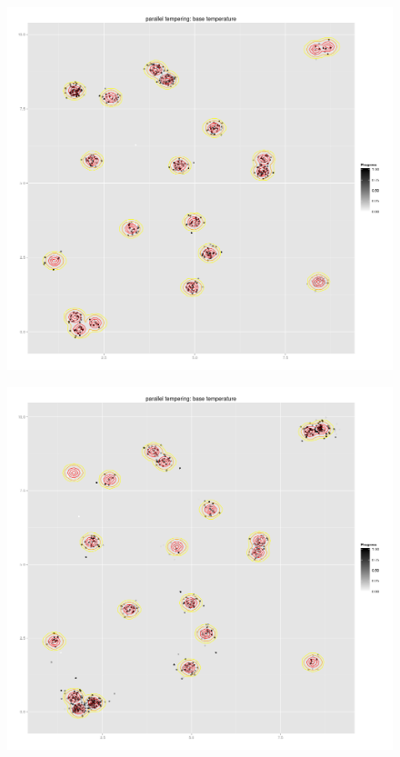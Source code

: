 \documentclass{book}
\begin{document}
\begin{figure}
	\begin{minipage}[b]{.5\linewidth}
		\centering \includegraphics[width=\textwidth, keepaspectratio=true]{./img/strat1with2000it.png}
		\label{plotStrategy1}
	\end{minipage}%
	\begin{minipage}[b]{.5\linewidth}
		\centering \includegraphics[width=\textwidth, keepaspectratio=true]{./img/strat2it2000.png}		

\end{minipage}
\end{figure}
\end{document}
